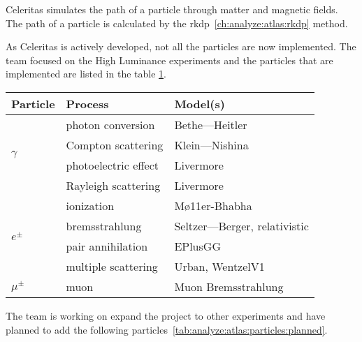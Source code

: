 Celeritas simulates the path of a particle through matter and magnetic fields.
The path of a particle is calculated by the \acrshort{rkdp}~\ref{ch:analyze:atlas:rkdp} method.


As Celeritas is actively developed, not all the particles are now implemented.
The team focused on the High Luminance experiments and the particles that are
implemented are listed in the table \ref{tab:analyze:atlas:particles:implemented}.

\begin{table}[ht]
    \centering
    \begin{tabular}{lll}
        \hline
        \textbf{Particle}         & \textbf{Process}     & \textbf{Model(s)}            \\
        \hline
        \multirow{4}{*}{$\gamma$} & photon conversion    & Bethe—Heitler                \\
                                  & Compton scattering   & Klein—Nishina                \\
                                  & photoelectric effect & Livermore                    \\
                                  & Rayleigh scattering  & Livermore                    \\
        \hline
        \multirow{4}{*}{$e^\pm$}  & ionization           & Mø11er-Bhabha                \\
                                  & bremsstrahlung       & Seltzer—Berger, relativistic \\
                                  & pair annihilation    & EPlusGG                      \\
                                  & multiple scattering  & Urban, WentzelV1             \\
        \hline
        $\mu^\pm$                 & muon                 & Muon Bremsstrahlung          \\
        \hline
    \end{tabular}
    \label{tab:analyze:atlas:particles:implemented}
\end{table}

The team is working on expand the project to other experiments and have planned
to add the following particles~\ref{tab:analyze:atlas:particles:planned}.

